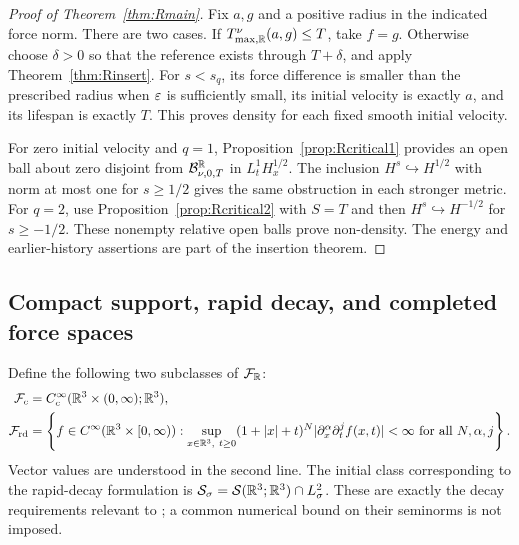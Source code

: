 \begin{proof}[Proof of Theorem~\ref{thm:Rmain}]
Fix $a,g$ and a positive radius in the indicated force norm. There are two cases. If $T^\nu_{\max,\mathbb R}(a,g)\le T$, take $f=g$. Otherwise choose $\delta>0$ so that the reference exists through $T+\delta$, and apply Theorem~\ref{thm:Rinsert}. For $s<s_q$, its force difference is smaller than the prescribed radius when $\varepsilon$ is sufficiently small, its initial velocity is exactly $a$, and its lifespan is exactly $T$. This proves density for each fixed smooth initial velocity.

For zero initial velocity and $q=1$, Proposition~\ref{prop:Rcritical1} provides an open ball about zero disjoint from $\mathcal B^\mathbb R_{\nu,0,T}$ in $L^1_tH^{1/2}_x$. The inclusion $H^s\hookrightarrow H^{1/2}$ with norm at most one for $s\ge1/2$ gives the same obstruction in each stronger metric. For $q=2$, use Proposition~\ref{prop:Rcritical2} with $S=T$ and then $H^s\hookrightarrow H^{-1/2}$ for $s\ge-1/2$. These nonempty relative open balls prove non-density. The energy and earlier-history assertions are part of the insertion theorem.
\end{proof}

\subsection{Compact support, rapid decay, and completed force spaces}
Define the following two subclasses of $\mathcal F_{\mathbb R}$:
\begin{align*}
 \mathcal F_c&=C_c^\infty(\mathbb R^3\times(0,\infty);\mathbb R^3),\\
 \mathcal F_{\mathrm{rd}}
 &=\left\{f\in C^\infty(\mathbb R^3\times[0,\infty)):
 \sup_{x\in\mathbb R^3,\ t\ge0}(1+|x|+t)^N
       |\partial_x^\alpha\partial_t^jf(x,t)|<\infty
 \text{ for all }N,\alpha,j\right\}.
\end{align*}
Vector values are understood in the second line. The initial class corresponding to the rapid-decay formulation is $\mathcal S_\sigma=\mathcal S(\mathbb R^3;\mathbb R^3)\cap L^2_\sigma$. These are exactly the decay requirements relevant to \cite[equations (4)--(5)]{clay}; a common numerical bound on their seminorms is not imposed.

